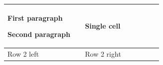 \par\medskip
\begin{longtable}{|p{0.45\linewidth}|p{0.45\linewidth}|}
\hline
First paragraph

Second paragraph

 & Single cell

 \\
\hline
Row 2 left

 & Row 2 right

 \\
\hline
\end{longtable}
\medskip
